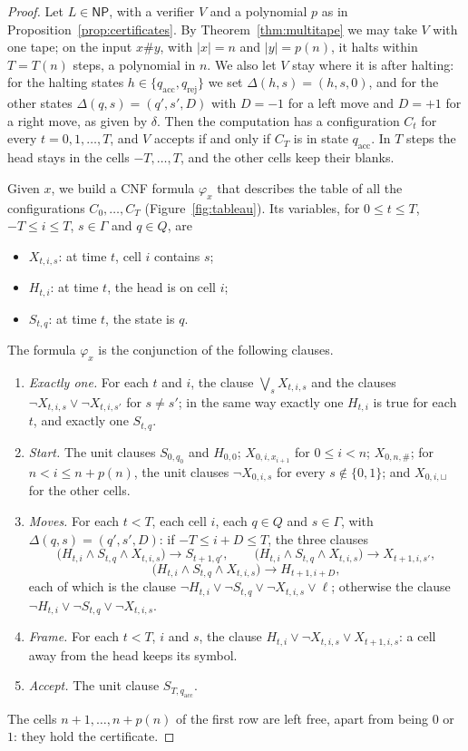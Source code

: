 \begin{proof}
Let $L\in\mathsf{NP}$, with a verifier $V$ and a polynomial $p$ as in Proposition~\ref{prop:certificates}. By Theorem~\ref{thm:multitape} we may take $V$ with one tape; on the input $x\#y$, with $|x|=n$ and $|y|=p(n)$, it halts within $T=T(n)$ steps, a polynomial in $n$. We also let $V$ stay where it is after halting: for the halting states $h\in\{q_{\mathrm{acc}},q_{\mathrm{rej}}\}$ we set $\Delta(h,s)=(h,s,0)$, and for the other states $\Delta(q,s)=(q',s',D)$ with $D=-1$ for a left move and $D=+1$ for a right move, as given by $\delta$. Then the computation has a configuration $C_t$ for every $t=0,1,\dots,T$, and $V$ accepts if and only if $C_T$ is in state $q_{\mathrm{acc}}$. In $T$ steps the head stays in the cells $-T,\dots,T$, and the other cells keep their blanks.

Given $x$, we build a CNF formula $\varphi_x$ that describes the table of all the configurations $C_0,\dots,C_T$ (Figure~\ref{fig:tableau}). Its variables, for $0\le t\le T$, $-T\le i\le T$, $s\in\Gamma$ and $q\in Q$, are
\begin{itemize}
\item $X_{t,i,s}$: at time $t$, cell $i$ contains $s$;
\item $H_{t,i}$: at time $t$, the head is on cell $i$;
\item $S_{t,q}$: at time $t$, the state is $q$.
\end{itemize}
The formula $\varphi_x$ is the conjunction of the following clauses.
\begin{enumerate}
\item \emph{Exactly one.} For each $t$ and $i$, the clause $\bigvee_sX_{t,i,s}$ and the clauses $\neg X_{t,i,s}\lor\neg X_{t,i,s'}$ for $s\ne s'$; in the same way exactly one $H_{t,i}$ is true for each $t$, and exactly one $S_{t,q}$.
\item \emph{Start.} The unit clauses $S_{0,q_0}$ and $H_{0,0}$; $X_{0,i,x_{i+1}}$ for $0\le i<n$; $X_{0,n,\#}$; for $n<i\le n+p(n)$, the unit clauses $\neg X_{0,i,s}$ for every $s\notin\{0,1\}$; and $X_{0,i,\sqcup}$ for the other cells.
\item \emph{Moves.} For each $t<T$, each cell $i$, each $q\in Q$ and $s\in\Gamma$, with $\Delta(q,s)=(q',s',D)$: if $-T\le i+D\le T$, the three clauses
\[
\bigl(H_{t,i}\land S_{t,q}\land X_{t,i,s}\bigr)\to S_{t+1,q'},\qquad
\bigl(H_{t,i}\land S_{t,q}\land X_{t,i,s}\bigr)\to X_{t+1,i,s'},
\]
\[
\bigl(H_{t,i}\land S_{t,q}\land X_{t,i,s}\bigr)\to H_{t+1,i+D},
\]
each of which is the clause $\neg H_{t,i}\lor\neg S_{t,q}\lor\neg X_{t,i,s}\lor\ell$; otherwise the clause $\neg H_{t,i}\lor\neg S_{t,q}\lor\neg X_{t,i,s}$.
\item \emph{Frame.} For each $t<T$, $i$ and $s$, the clause $H_{t,i}\lor\neg X_{t,i,s}\lor X_{t+1,i,s}$: a cell away from the head keeps its symbol.
\item \emph{Accept.} The unit clause $S_{T,q_{\mathrm{acc}}}$.
\end{enumerate}
The cells $n+1,\dots,n+p(n)$ of the first row are left free, apart from being $0$ or $1$: they hold the certificate.


\end{proof}
